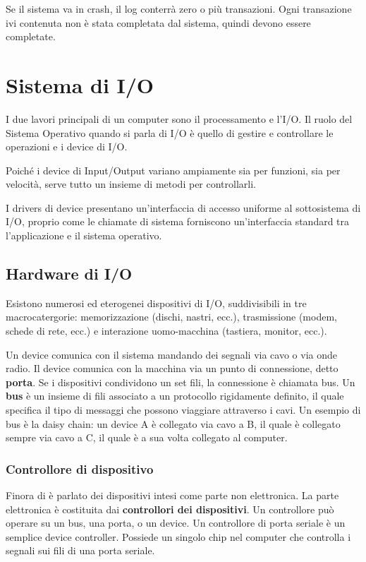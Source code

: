 \documentclass[a4paper]{article}
\begin{document}
Se il sistema va in crash, il log conterrà zero o più transazioni. Ogni transazione ivi contenuta non è stata completata dal sistema, quindi devono essere completate.


\section{Sistema di I/O}

I due lavori principali di un computer sono il processamento e l'I/O. Il ruolo del Sistema Operativo quando si parla di I/O è quello di gestire e controllare le operazioni e i device di I/O.

Poiché i device di Input/Output variano ampiamente sia per funzioni, sia per velocità, serve tutto un insieme di metodi per controllarli.

I drivers di device presentano un'interfaccia di accesso uniforme al sottosistema di I/O, proprio come le chiamate di sistema forniscono un'interfaccia standard tra l'applicazione e il sistema operativo.

\subsection{Hardware di I/O}
Esistono numerosi ed eterogenei dispositivi di I/O, suddivisibili in tre macrocatergorie: memorizzazione (dischi, nastri, ecc.), trasmissione (modem, schede di rete, ecc.) e interazione uomo-macchina (tastiera, monitor, ecc.).

Un device comunica con il sistema mandando dei segnali via cavo o via onde radio. Il device comunica con la macchina via un punto di connessione, detto \textbf{porta}. Se i dispositivi condividono un set fili, la connessione è chiamata bus. Un \textbf{bus} è un insieme di fili associato a un protocollo rigidamente definito, il quale specifica il tipo di messaggi che possono viaggiare attraverso i cavi. Un esempio di bus è la daisy chain: un device A è collegato via cavo a B, il quale è collegato sempre via cavo a C, il quale è a sua volta collegato al computer.

\subsubsection{Controllore di dispositivo}

Finora di è parlato dei dispositivi intesi come parte non elettronica. La parte elettronica è costituita dai \textbf{controllori dei dispositivi}. Un controllore può operare su un bus, una porta, o un device. Un controllore di porta seriale è un semplice device controller. Possiede un singolo chip nel computer che controlla i segnali sui fili di una porta seriale.
\end{document}
